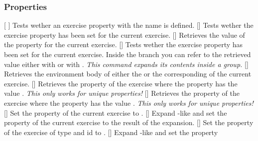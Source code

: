 \documentclass{xsim-manual}
\begin{document}
\subsubsection{Properties}
\begin{commands}
  \expandable{}[%
  ]
    Tests wether an exercise property with the name  is defined.
  \expandable{}[]
    Tests wether the exercise property  has been set for the
    current exercise.
  \expandable{}[]
    Retrieves the value of the property  for the current
    exercise.
  []
    Tests wether the exercise property  has been set for the
    current exercise.  Inside the  branch you can refer to the
    retrieved value either with  or with .
    \emph{This command expands its contents inside a group.}
  []
    Retrieves the environment body of either the
     or the corresponding  of the current
    exercise.
  \expandable{}[]
    Retrieves the property  of the exercise where the property
     has the value .  \emph{This only works for
      \emph{unique} properties!}
  []
    Retrieves the property  of the exercise where the
    property  has the value .  \emph{This only
      works for \emph{unique} properties!}
  []
    Set the property  of the current
    exercise to .
  []
    Expand  -like and set the property
     of the current exercise to the result of the expansion.
  []
    Set the property  of the exercise of type
     and id  to .
  []
    Expand  -like and set the property

\end{commands}
\end{document}
